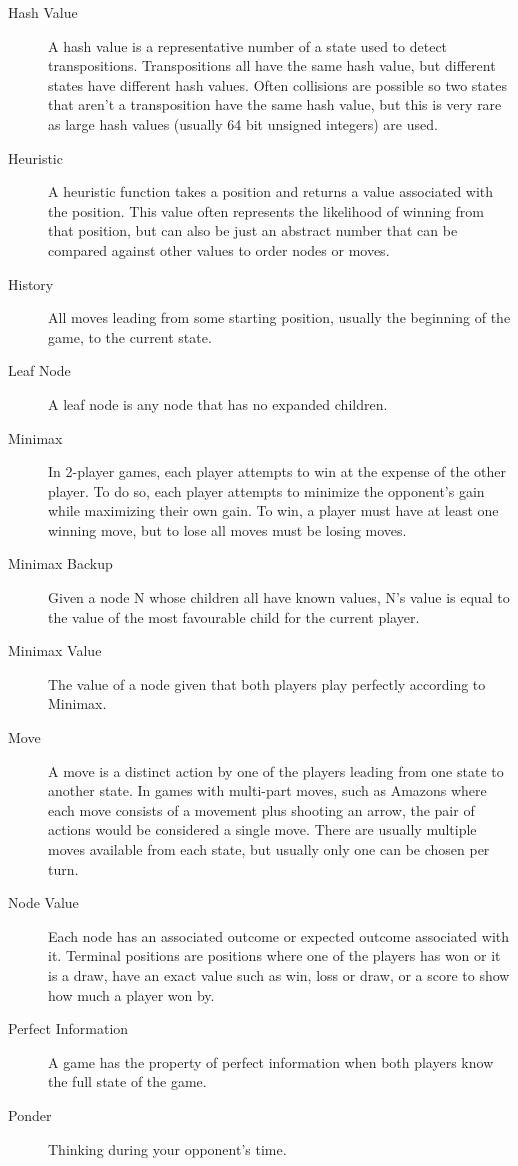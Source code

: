 \begin{description}
\item[Hash Value] A hash value is a representative number of a state used to detect transpositions. Transpositions all have the same hash value, but different states have different hash values. Often collisions are possible so two states that aren't a transposition have the same hash value, but this is very rare as large hash values (usually 64 bit unsigned integers) are used.
\item[Heuristic] A heuristic function takes a position and returns a value associated with the position. This value often represents the likelihood of winning from that position, but can also be just an abstract number that can be compared against other values to order nodes or moves.
\item[History] All moves leading from some starting position, usually the beginning of the game, to the current state.
\item[Leaf Node] A leaf node is any node that has no expanded children.
\item[Minimax] In 2-player games, each player attempts to win at the expense of the other player. To do so, each player attempts to minimize the opponent's gain while maximizing their own gain. To win, a player must have at least one winning move, but to lose all moves must be losing moves.
\item[Minimax Backup] Given a node N whose children all have known values, N's value is equal to the value of the most favourable child for the current player.
\item[Minimax Value] The value of a node given that both players play perfectly according to Minimax.
\item[Move] A move is a distinct action by one of the players leading from one state to another state. In games with multi-part moves, such as Amazons where each move consists of a movement plus shooting an arrow, the pair of actions would be considered a single move. There are usually multiple moves available from each state, but usually only one can be chosen per turn.
\item[Node Value] Each node has an associated outcome or expected outcome associated with it. Terminal positions are positions where one of the players has won or it is a draw, have an exact value such as win, loss or draw, or a score to show how much a player won by.
\item[Perfect Information] A game has the property of perfect information when both players know the full state of the game.
\item[Ponder] Thinking during your opponent's time.

\end{description}
